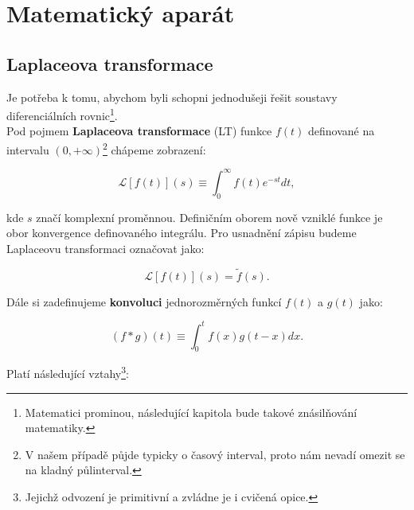 \section{Matematický aparát}

\subsection{Laplaceova transformace}

Je potřeba k tomu, abychom byli schopni jednodušeji řešit soustavy diferenciálních rovnic\footnote{Matematici prominou, následující kapitola bude takové znásilňování matematiky.}.\\

Pod pojmem \textbf{Laplaceova transformace} (LT) funkce $f(t)$ definované na intervalu $(0,+\infty)$\footnote{V našem případě půjde typicky o časový interval, proto nám nevadí omezit se na kladný půlinterval.} chápeme zobrazení:

\begin{equation}
  \boxed{
  \mathcal{L}[f(t)](s) \equiv \int_0^\infty f(t) e^{-st} dt,
  \label{Laplaceovka}}
\end{equation}

kde $s$ značí komplexní proměnnou. Definičním oborem nově vzniklé funkce je obor konvergence definovaného integrálu. Pro usnadnění zápisu budeme Laplaceovu transformaci označovat jako:

$$ \mathcal{L}[f(t)](s) = \tilde{f}(s). $$

Dále si zadefinujeme \textbf{konvoluci} jednorozměrných funkcí $f(t)$ a $g(t)$ jako:

\begin{equation}
  \boxed{
  (f*g)(t) \equiv \int_0^t f(x) g(t-x) dx.
  \label{Konvoluce}}
\end{equation}

Platí následující vztahy\footnote{Jejichž odvození je primitivní a zvládne je i cvičená opice.}:

